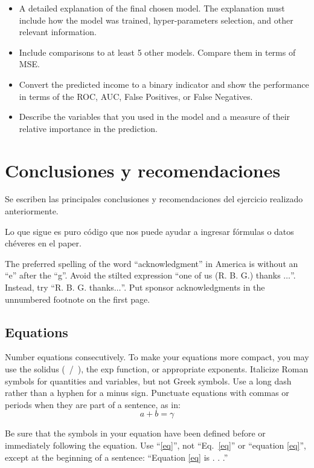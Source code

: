 \documentclass[conference, 10pt]{IEEEtran}
\begin{document}
\begin{itemize}
\item A detailed explanation of the final chosen model. The explanation must
include how the model was trained, hyper-parameters selection, and other
relevant information.
\item Include comparisons to at least 5 other models. Compare them in terms of
MSE.
\item Convert the predicted income to a binary indicator and show the performance in terms of the ROC, AUC, False Positives, or False Negatives.
\item Describe the variables that you used in the model and a measure of their relative importance in the prediction.
\end{itemize}


\section{Conclusiones y recomendaciones}

Se escriben las principales conclusiones y recomendaciones del ejercicio realizado anteriormente.

Lo que sigue es puro código que nos puede ayudar a ingresar fórmulas o datos chéveres en el paper.


The preferred spelling of the word ``acknowledgment'' in America is without 
an ``e'' after the ``g''. Avoid the stilted expression ``one of us (R. B. 
G.) thanks $\ldots$''. Instead, try ``R. B. G. thanks$\ldots$''. Put sponsor 
acknowledgments in the unnumbered footnote on the first page.

\subsection{Equations}
Number equations consecutively. To make your 
equations more compact, you may use the solidus (~/~), the exp function, or 
appropriate exponents. Italicize Roman symbols for quantities and variables, 
but not Greek symbols. Use a long dash rather than a hyphen for a minus 
sign. Punctuate equations with commas or periods when they are part of a 
sentence, as in:
\begin{equation}
a+b=\gamma\label{eq}
\end{equation}

Be sure that the 
symbols in your equation have been defined before or immediately following 
the equation. Use ``\eqref{eq}'', not ``Eq.~\eqref{eq}'' or ``equation \eqref{eq}'', except at 
the beginning of a sentence: ``Equation \eqref{eq} is . . .''
\end{document}
